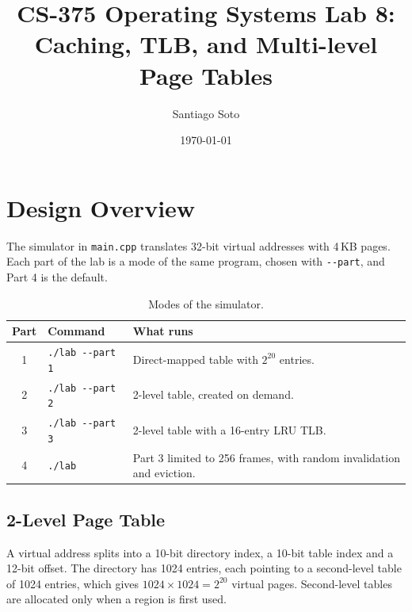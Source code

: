 \documentclass[11pt]{article}
\newcommand{\code}[1]{\texttt{#1}}
\begin{document}
\sloppy

\title{CS-375 Operating Systems Lab 8:\\Caching, TLB, and Multi-level Page Tables}
\author{Santiago Soto}
\date{\today}
\maketitle

\tableofcontents
\newpage

\section{Design Overview}

The simulator in \code{main.cpp} translates 32-bit virtual addresses with 4\,KB
pages. Each part of the lab is a mode of the same program, chosen with
\code{-{}-part}, and Part 4 is the default.

\begin{table}[H]
\centering
\begin{tabularx}{\textwidth}{clX}
\toprule
\textbf{Part} & \textbf{Command} & \textbf{What runs} \\
\midrule
1 & \code{./lab -{}-part 1} & Direct-mapped table with $2^{20}$ entries. \\
2 & \code{./lab -{}-part 2} & 2-level table, created on demand. \\
3 & \code{./lab -{}-part 3} & 2-level table with a 16-entry LRU TLB. \\
4 & \code{./lab} & Part 3 limited to 256 frames, with random invalidation and eviction. \\
\bottomrule
\end{tabularx}
\caption{Modes of the simulator.}
\end{table}

\subsection{2-Level Page Table}

A virtual address splits into a 10-bit directory index, a 10-bit table index and
a 12-bit offset. The directory has 1024 entries, each pointing to a second-level
table of 1024 entries, which gives $1024 \times 1024 = 2^{20}$ virtual pages.
Second-level tables are allocated only when a region is first used.
\end{document}
